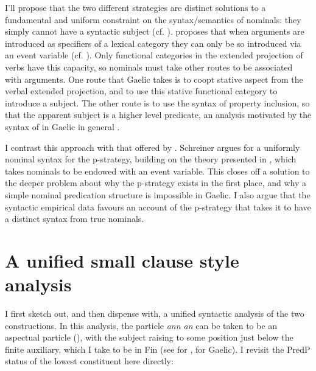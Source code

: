 \documentclass[output=paper]{langsci/langscibook}
\begin{document}
I'll propose that the two different strategies are distinct solutions to a
fundamental and uniform constraint on the syntax/semantics of nominals: they
simply cannot have a syntactic subject (cf. \citealt{Baker03}).
\citet{adgerbook} proposes that when arguments are introduced as specifiers of a
lexical category they can only be so introduced via an event variable (cf.
\citealt{kratzer96}). Only functional categories in the extended projection of
verbs have this capacity, so nominals must take other routes to be associated
with arguments. One route that Gaelic takes is to coopt stative aspect from the
verbal extended projection, and to use this stative functional category to
introduce a subject. The other route is to use the syntax of property
inclusion, so that the apparent subject is a higher level predicate, an
analysis motivated by the syntax of  in Gaelic in general
\parencite{Adger2011b}.

I contrast this approach with that offered by \citet{schreiner:15}. Schreiner
argues for a uniformly nominal syntax for the p-strategy, building on the
theory presented in \citet{roy:06}, which takes nominals to be endowed with an
event variable. This closes off a solution to the deeper problem about why the
p-strategy exists in the first place, and why a simple nominal predication
structure is impossible in Gaelic. I also argue that the syntactic empirical
data favours an account of the p-strategy that takes it to have a distinct
syntax from true nominals.

\section{A unified small clause style analysis}\label{pred-inv}

I first sketch out, and then dispense with, a unified syntactic analysis of the two constructions. In
this analysis, the particle \emph{ann an} can be taken to be an aspectual
particle (\citealt{cram:83}), with the subject raising to some position just
below the finite auxiliary, which I take to be in Fin (see \citealt{Roberts2005}
for , \citealt{adger:07} for Gaelic). I revisit the PredP status of the
lowest constituent here directly:

\ea
\end{document}
